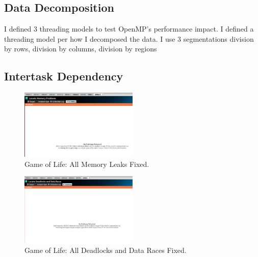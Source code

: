 \documentclass[journal,10pt,onecolumn,draftcls]{IEEEtran}
\begin{document}
\subsection{Data Decomposition}
I defined 3 threading models to test OpenMP's performance impact. I defined a threading model
per how I decomposed the data.  I use 3 segmentations division by rows, division by columns, 
division by regions


\subsection{Intertask Dependency}

%


\begin{figure}[!t]
\begin{center}
\includegraphics[width=0.5\textwidth]{figures/ChangeSet14_Memory.png}
\caption{Game of Life: All Memory Leaks Fixed.}
\label{fig:inspector_clean_memory}
\end{center}
\end{figure}

\begin{figure}[!t]
\begin{center}
\includegraphics[width=0.5\textwidth]{figures/ChangeSet14.png}
\caption{Game of Life: All Deadlocks and Data Races Fixed.}
\label{fig:inspector_clean_deadlocks}
\end{center}
\end{figure}
\end{document}
